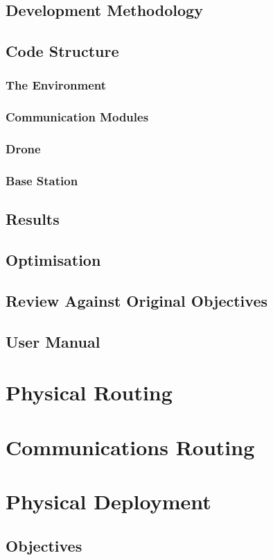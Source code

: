 \documentclass[12pt,a4paper,twoside]{report}
\begin{document}
	\section{Development Methodology}
	\section{Code Structure}
		\subsection{The Environment}
		\subsection{Communication Modules}
		\subsection{Drone}
		\subsection{Base Station}
	\section{Results}
	\section{Optimisation}
	\section{Review Against Original Objectives}
	\section{User Manual}

\chapter{Physical Routing}

\chapter{Communications Routing}

\chapter{Physical Deployment}
	\section{Objectives}
\end{document}
